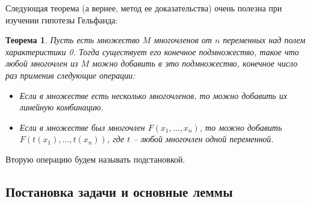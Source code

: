 \documentclass[12pt,a4paper]{article}
\newtheorem{theorem}{Теорема}[section]
\begin{document}
    Следующая теорема (а вернее, метод ее доказательства) очень полезна при изучении гипотезы Гельфанда:
    \vskip 0.1in\noindent
    \begin{theorem}
        \label{main}
        Пусть есть множество $M$ многочленов от $n$ переменных над полем характеристики 0. Тогда существует его конечное подмножество, такое что любой многочлен из $M$ можно добавить в это подмножество, конечное число раз применив следующие операции:
        \begin{itemize}
            \item Если в множестве есть несколько многочленов, то можно добавить их линейную комбинацию.
            \item Если в множестве был многочлен $F(x_1,\ldots,x_n)$, то можно добавить $F(t(x_1),\ldots,t(x_n))$, где $t$ -- любой многочлен одной переменной.
        \end{itemize}
    \end{theorem}
    \vskip 0.1in\noindent
    Вторую операцию будем называть подстановкой.

    \subsection{Постановка задачи и основные леммы}
\end{document}
